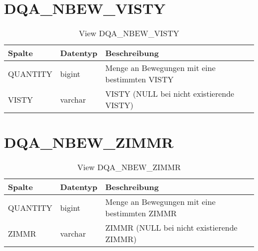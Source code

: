   \section{DQA\_NBEW\_VISTY}

  \begin{table}[ht]
    \centering
    \caption{View DQA\_NBEW\_VISTY}
    \label{tab:dqanbewvisty}
    \begin{tabular}{||l|l|p{10cm}||}
      \hline
      Spalte & Datentyp & Beschreibung \\ [0.5ex] \hline \hline
QUANTITY & bigint & Menge an Bewegungen mit eine bestimmten VISTY \\ \hline
VISTY & varchar & VISTY (NULL bei nicht existierende VISTY)\\ \hline
    \end{tabular}
  \end{table}
 \clearpage
  \section{DQA\_NBEW\_ZIMMR}

  \begin{table}[ht]
    \centering
    \caption{View DQA\_NBEW\_ZIMMR}
    \label{tab:dqanbewzimmr}
    \begin{tabular}{||l|l|p{10cm}||}
      \hline
      Spalte & Datentyp & Beschreibung \\ [0.5ex] \hline \hline
QUANTITY & bigint & Menge an Bewegungen mit eine bestimmten ZIMMR \\ \hline
ZIMMR & varchar & ZIMMR (NULL bei nicht existierende ZIMMR)\\ \hline
    \end{tabular}
  \end{table}
 \clearpage
